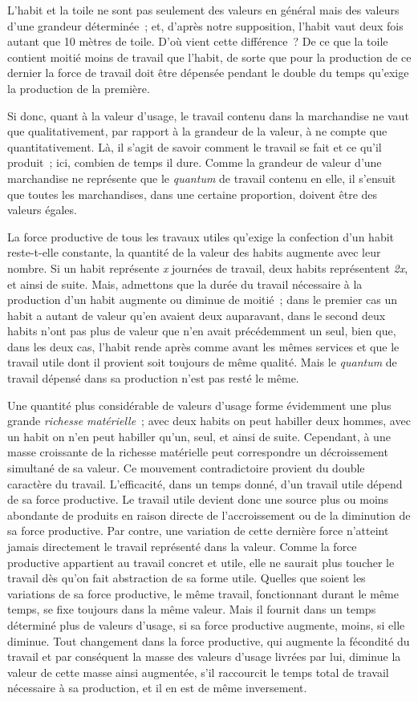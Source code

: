 \documentclass[french,twoside]{book} %
\begin{document}
L’habit et la toile ne sont pas seulement des valeurs en général mais des valeurs d’une grandeur déterminée ; et, d’après notre supposition, l’habit vaut deux fois autant que 10 mètres de toile. D’où vient cette différence ? De ce que la toile contient moitié moins de travail que l’habit, de sorte que pour la production de ce dernier la force de travail doit être dépensée pendant le double du temps qu’exige la production de la première.\par
Si donc, quant à la valeur d’usage, le travail contenu dans la marchandise ne vaut que qualitativement, par rapport à la grandeur de la valeur, à ne compte que quantitativement. Là, il s’agit de savoir comment le travail se fait et ce qu’il produit ; ici, combien de temps il dure. Comme la grandeur de valeur d’une marchandise ne représente que le \emph{quantum} de travail contenu en elle, il s’ensuit que toutes les marchandises, dans une certaine proportion, doivent être des valeurs égales.\par
La force productive de tous les travaux utiles qu’exige la confection d’un habit reste-t-elle constante, la quantité de la valeur des habits augmente avec leur nombre. Si un habit représente \emph{x} journées de travail, deux habits représentent \emph{2x}, et ainsi de suite. Mais, admettons que la durée du travail nécessaire à la production d’un habit augmente ou diminue de moitié ; dans le premier cas un habit a autant de valeur qu’en avaient deux auparavant, dans le second deux habits n’ont pas plus de valeur que n’en avait précédemment un seul, bien que, dans les deux cas, l’habit rende après comme avant les mêmes services et que le travail utile dont il provient soit toujours de même qualité. Mais le \emph{quantum} de travail dépensé dans sa production n’est pas resté le même.\par
Une quantité plus considérable de valeurs d’usage forme évidemment une plus grande \emph{richesse matérielle} ; avec deux habits on peut habiller deux hommes, avec un habit on n’en peut habiller qu’un, seul, et ainsi de suite. Cependant, à une masse croissante de la richesse matérielle peut correspondre un décroissement simultané de sa valeur. Ce mouvement contradictoire provient du double caractère du travail. L’efficacité, dans un temps donné, d’un travail utile dépend de sa force productive. Le travail utile devient donc une source plus ou moins abondante de produits en raison directe de l’accroissement ou de la diminution de sa force productive. Par contre, une variation de cette dernière force n’atteint jamais directement le travail représenté dans la valeur. Comme la force productive appartient au travail concret et utile, elle ne saurait plus toucher le travail dès qu’on fait abstraction de sa forme utile. Quelles que soient les variations de sa force productive, le même travail, fonctionnant durant le même temps, se fixe toujours dans la même valeur. Mais il fournit dans un temps déterminé plus de valeurs d’usage, si sa force productive augmente, moins, si elle diminue. Tout changement dans la force productive, qui augmente la fécondité du travail et par conséquent la masse des valeurs d’usage livrées par lui, diminue la valeur de cette masse ainsi augmentée, s’il raccourcit le temps total de travail nécessaire à sa production, et il en est de même inversement.\par
\end{document}
